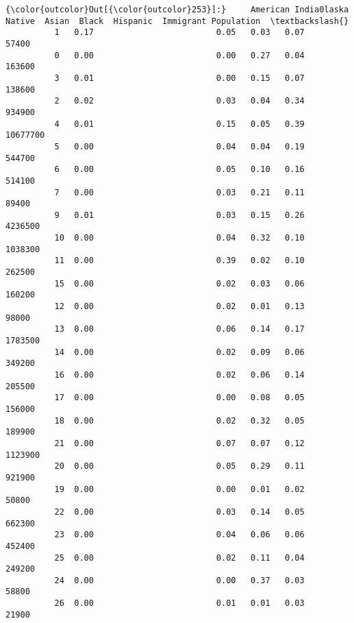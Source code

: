 \documentclass[11pt]{article}
\begin{document}
\begin{Verbatim}[commandchars=\\\{\}]
{\color{outcolor}Out[{\color{outcolor}253}]:}     American India0laska Native  Asian  Black  Hispanic  Immigrant Population  \textbackslash{}
          1   0.17                         0.05   0.03   0.07      57400                  
          0   0.00                         0.00   0.27   0.04      163600                 
          3   0.01                         0.00   0.15   0.07      138600                 
          2   0.02                         0.03   0.04   0.34      934900                 
          4   0.01                         0.15   0.05   0.39      10677700               
          5   0.00                         0.04   0.04   0.19      544700                 
          6   0.00                         0.05   0.10   0.16      514100                 
          7   0.00                         0.03   0.21   0.11      89400                  
          9   0.01                         0.03   0.15   0.26      4236500                
          10  0.00                         0.04   0.32   0.10      1038300                
          11  0.00                         0.39   0.02   0.10      262500                 
          15  0.00                         0.02   0.03   0.06      160200                 
          12  0.00                         0.02   0.01   0.13      98000                  
          13  0.00                         0.06   0.14   0.17      1783500                
          14  0.00                         0.02   0.09   0.06      349200                 
          16  0.00                         0.02   0.06   0.14      205500                 
          17  0.00                         0.00   0.08   0.05      156000                 
          18  0.00                         0.02   0.32   0.05      189900                 
          21  0.00                         0.07   0.07   0.12      1123900                
          20  0.00                         0.05   0.29   0.11      921900                 
          19  0.00                         0.00   0.01   0.02      50800                  
          22  0.00                         0.03   0.14   0.05      662300                 
          23  0.00                         0.04   0.06   0.06      452400                 
          25  0.00                         0.02   0.11   0.04      249200                 
          24  0.00                         0.00   0.37   0.03      58800                  
          26  0.00                         0.01   0.01   0.03      21900                  

\end{Verbatim}
\end{document}
